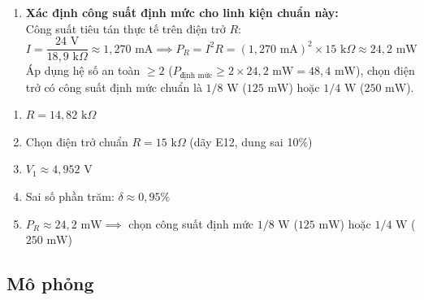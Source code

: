 \begin{enumerate}[label=\alph*.]
  \item \textbf{Xác định công suất định mức cho linh kiện chuẩn này:} \\
        Công suất tiêu tán thực tế trên điện trở $R$:
        \[
        I = \frac{24\text{ V}}{18{,}9\text{ k}\Omega} \approx 1{,}270\text{ mA} \implies P_R = I^2 R = (1{,}270\text{ mA})^2 \times 15\text{ k}\Omega \approx 24{,}2\text{ mW}
        \]
        Áp dụng hệ số an toàn $\ge 2$ ($P_{\text{định mức}} \ge 2 \times 24{,}2\text{ mW} = 48{,}4\text{ mW}$), chọn điện trở có công suất định mức chuẩn là $1/8\text{ W}$ ($125\text{ mW}$) hoặc $1/4\text{ W}$ ($250\text{ mW}$).
\end{enumerate}

\begin{dapsobox}
  \begin{enumerate}[label=\alph*.,leftmargin=1.5em]
    \item $R = 14{,}82\text{ k}\Omega$
    \item Chọn điện trở chuẩn $R = 15\text{ k}\Omega$ (dãy E12, dung sai 10\%)
    \item $V_1 \approx 4{,}952\text{ V}$
    \item Sai số phần trăm: $\delta \approx 0{,}95\%$
    \item $P_R \approx 24{,}2\text{ mW} \implies$ chọn công suất định mức $1/8\text{ W}$ ($125\text{ mW}$) hoặc $1/4\text{ W}$ ($250\text{ mW}$)
  \end{enumerate}
\end{dapsobox}

\subsection{Mô phỏng}
\simresult
{}

